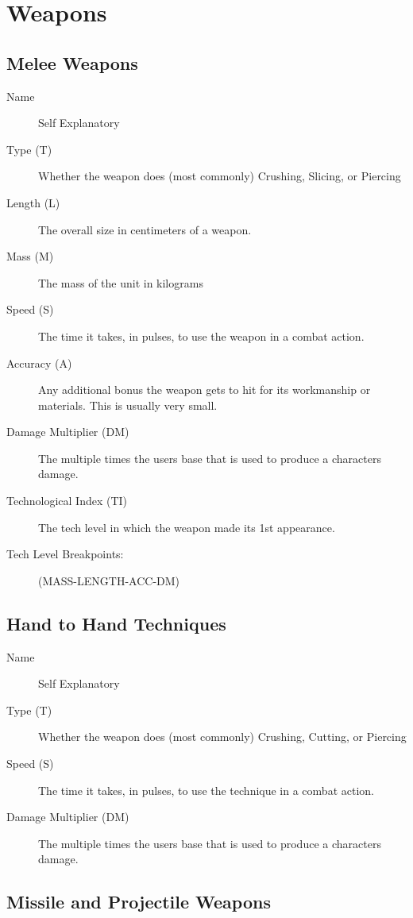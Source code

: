 \chapter{Weapons}

\section{Melee Weapons}

\begin{description}
	\item[Name] 
	Self Explanatory
	\item[Type (T)] 
	Whether the weapon does (most commonly) Crushing, Slicing, or Piercing
	\item[Length (L)] 
	The overall size in centimeters of a weapon.
	\item[Mass (M)]	
	The mass of the unit in kilograms
	\item[Speed (S)] 
	The time it takes, in pulses, to use the weapon in a combat action.
	\item[Accuracy (A)] 
	Any additional bonus the weapon gets to hit for its workmanship or materials. This is usually very small.
	\item[Damage Multiplier (DM)] 
	The multiple times the users base that is used to produce a characters damage.
	\item[Technological Index (TI)] 
	The tech level in which the weapon made its 1st appearance.
	\item[Tech Level Breakpoints:] 
	(MASS-LENGTH-ACC-DM)
\end{description}

\clearpage
\section{Hand to Hand Techniques}

\begin{description}
	\item[Name] 
	Self Explanatory
	\item[Type (T)] 	
	Whether the weapon does (most commonly) Crushing, Cutting, or Piercing
	\item[Speed (S)] 	
	The time it takes, in pulses, to use the technique in a combat action.
	\item[Damage Multiplier (DM)] 	
	The multiple times the users base that is used to produce a characters damage.
\end{description}

\clearpage
\section{Missile and Projectile Weapons}

